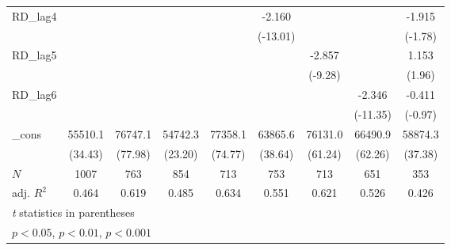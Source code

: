 {\begin{tabular}{l*{8}{c}}
\addlinespace
RD\_lag4     &                     &                     &                     &                     &      -2.160\sym{***}&                     &                     &      -1.915         \\
            &                     &                     &                     &                     &    (-13.01)         &                     &                     &     (-1.78)         \\
\addlinespace
RD\_lag5     &                     &                     &                     &                     &                     &      -2.857\sym{***}&                     &       1.153         \\
            &                     &                     &                     &                     &                     &     (-9.28)         &                     &      (1.96)         \\
\addlinespace
RD\_lag6     &                     &                     &                     &                     &                     &                     &      -2.346\sym{***}&      -0.411         \\
            &                     &                     &                     &                     &                     &                     &    (-11.35)         &     (-0.97)         \\
\addlinespace
\_cons      &     55510.1\sym{***}&     76747.1\sym{***}&     54742.3\sym{***}&     77358.1\sym{***}&     63865.6\sym{***}&     76131.0\sym{***}&     66490.9\sym{***}&     58874.3\sym{***}\\
            &     (34.43)         &     (77.98)         &     (23.20)         &     (74.77)         &     (38.64)         &     (61.24)         &     (62.26)         &     (37.38)         \\
\midrule
\(N\)       &        1007         &         763         &         854         &         713         &         753         &         713         &         651         &         353         \\
adj. \(R^{2}\)&       0.464         &       0.619         &       0.485         &       0.634         &       0.551         &       0.621         &       0.526         &       0.426         \\
\bottomrule
\multicolumn{9}{l}{\footnotesize \textit{t} statistics in parentheses}\\
\multicolumn{9}{l}{\footnotesize \sym{*} \(p<0.05\), \sym{**} \(p<0.01\), \sym{***} \(p<0.001\)}\\
\end{tabular}
}
